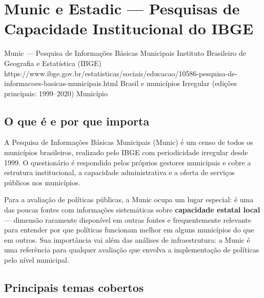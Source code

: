 \section{Munic e Estadic --- Pesquisas de Capacidade Institucional
         do IBGE}

\ficharapida
  {Munic --- Pesquisa de Informações Básicas Municipais}
  {Instituto Brasileiro de Geografia e Estatística (IBGE)}
  {https://www.ibge.gov.br/estatisticas/sociais/educacao/10586-pesquisa-de-informacoes-basicas-municipais.html}
  {Brasil e municípios}
  {Irregular (edições principais: 1999--2020)}
  {Município}

\subsection{O que é e por que importa}

A Pesquisa de Informações Básicas Municipais (Munic) é um censo de todos os municípios brasileiros, realizado pelo IBGE com periodicidade irregular desde 1999. O questionário é respondido pelos próprios gestores municipais e cobre a estrutura institucional, a capacidade administrativa e a oferta de serviços públicos nos municípios.

Para a avaliação de políticas públicas, a Munic ocupa um lugar especial: é uma das poucas fontes com informações sistemáticas sobre \textbf{capacidade estatal local} --- dimensão raramente disponível em outras fontes e frequentemente relevante para entender por que políticas funcionam melhor em alguns municípios do que em outros. Sua importância vai além das análises de infraestrutura: a Munic é uma referência para qualquer avaliação que envolva a implementação de políticas pelo nível municipal.

\subsection{Principais temas cobertos}

